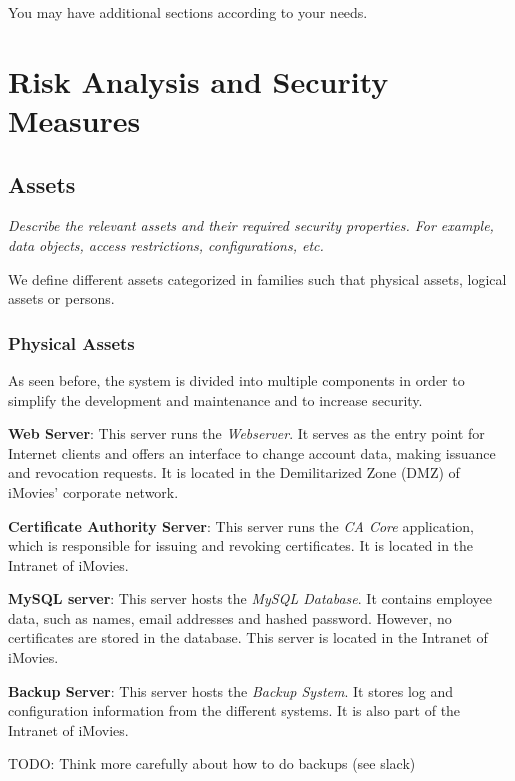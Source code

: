 \documentclass[english]{article}
\begin{document}
You may have additional sections according to your needs.


\section{Risk Analysis and Security Measures}

\subsection{Assets}

\textit{Describe the relevant assets and their required security
  properties. For example, data objects, access restrictions,
  configurations, etc.
  }
 
We define different assets categorized in families such that physical assets, logical assets or persons.

\subsubsection{Physical Assets}
As seen before, the system is divided into multiple components in order to simplify the development and maintenance and to increase security.

\textbf{Web Server}: This server runs the \emph{Webserver}. It serves as the entry point for Internet clients and offers an interface to change account data, making issuance and revocation requests. It is located in the Demilitarized Zone (DMZ) of iMovies' corporate network.

\textbf{Certificate Authority Server}: This server runs the \emph{CA Core} application, which is responsible for issuing and revoking certificates. It is located in the Intranet of iMovies.


\textbf{MySQL server}: This server hosts the \emph{MySQL Database}. It contains employee data, such as names, email addresses and hashed password. However, no certificates are stored in the database. This server is located in the Intranet of iMovies.

\textbf{Backup Server}: This server hosts the \emph{Backup System}. It stores log and configuration information from the different systems. It is also part of the Intranet of iMovies.

TODO: Think more carefully about how to do backups (see slack)
\end{document}
